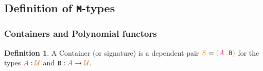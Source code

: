 \documentclass[xelatex,mathserif,serif,notheorems]{beamer} %
\theoremstyle{plain} %
\theoremstyle{definition}
\newtheorem{defn}[thm]{Definition}%
\theoremstyle{remark}
\newcommand*{\term}[1]{\textcolor{green!30!black}{#1}} %
\newcommand*{\type}[1]{\textcolor{magenta!90!black}{#1}}
\newcommand*{\container}[1]{\textcolor{orange}{#1}}
\newcommand*{\containerpair}[2]{\ensuremath{\colorlet{savedleftcolor}{.}\color{orange}\left(\color{savedleftcolor}#1\,\textcolor{orange}{\mathbf{,}}\,#2\color{orange}\right)\color{savedleftcolor}}}
\newcommand*{\universe}[1]{\textcolor{orange!80!black}{#1}}
\newcommand*{\function}[1]{\textcolor{blue!60!black}{\ensuremath{\mathtt{#1}}}}
\newcommand*{\typeformer}[1]{\ensuremath{\mathtt{#1}}}
\newcommand*{\functor}[1]{\ensuremath{\mathbf{\mathtt{#1}}}}
\newcommand{\setlengths}{
  \setlength{\abovedisplayskip}{4pt}
  \setlength{\belowdisplayskip}{4pt}
  \setlength{\abovedisplayshortskip}{2pt}
  \setlength{\belowdisplayshortskip}{2pt}
}
\begin{document}
\subsection{Definition of \texttt{M}-types}

\begin{frame}[fragile]
  \frametitle{Containers and Polynomial functors}
  \begin{defn}\setlengths
    A Container (or signature) is a dependent pair \(\container{S} = \containerpair{\type{A}}{\typeformer{B}}\) for the types \(\type{A} : \universe{\mathcal{U}}\) and \(\typeformer{B} : \type{A} \rightarrow \universe{\mathcal{U}}\). 
  \end{defn}
  \begin{figure}
    \centering
  \end{figure}
\end{frame}
\end{document}
